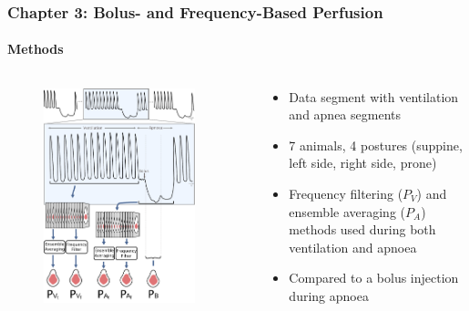 \documentclass[10pt,    %
    english,            %
    xcolor=table,       %
    envcountsect,        %
    aspectratio=1610
]{beamer}
\begin{document}
\begin{frame}
	\frametitle{Chapter 3: Bolus- and Frequency-Based Perfusion}
	\framesubtitle{Methods}
	\begin{columns}[c]
		\begin{column}{0.5\textwidth}
	\begin{figure}
		\centering
	\includegraphics[width=0.9\textwidth,trim={0 0 0 3.35cm},clip]{imgs/fig-methodsOverview.pdf}
	\end{figure}
\end{column}
\begin{column}{0.5\textwidth}
	\begin{itemize}
		\item Data segment with ventilation and apnea segments
		\item 7 animals, 4 postures (suppine, left side, right side, prone)
		\item Frequency filtering ($P_V$) and ensemble averaging ($P_A$) methods used during both
		ventilation and apnoea
		\item Compared to a bolus injection during apnoea
	\end{itemize}
\end{column}
\end{columns}
\end{frame}
\end{document}
